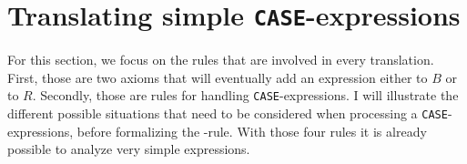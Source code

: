

\section{Translating simple \texttt{CASE}-expressions}

For this section, we focus on the rules that are involved in every translation. First, those are two axioms that will eventually add an expression either to $B$ or to $R$. Secondly, those are rules for handling \texttt{CASE}-expressions. I will illustrate the different possible situations that need to be considered when processing a \texttt{CASE}-expressions, before formalizing the \RWHEN-rule. With those four rules it is already possible to analyze very simple expressions.

